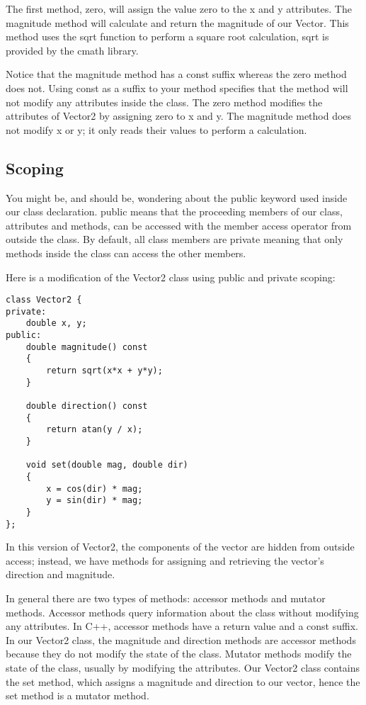 \documentclass[a4paper,12pt]{article}
\begin{document}
The first method, zero, will assign the value zero to the x and y attributes. The magnitude method will calculate and return the magnitude of our Vector. This method uses the sqrt function to perform a square root calculation, sqrt is provided by the cmath library.

Notice that the magnitude method has a const suffix whereas the zero method does not. Using const as a suffix to your method specifies that the method will not modify any attributes inside the class. The zero method modifies the attributes of Vector2 by assigning zero to x and y. The magnitude method does not modify x or y; it only reads their values to perform a calculation.

\subsection*{Scoping}

You might be, and should be, wondering about the public keyword used inside our class declaration. public means that the proceeding members of our class, attributes and methods, can be accessed with the member access operator from outside the class. By default, all class members are private meaning that only methods inside the class can access the other members. 

Here is a modification of the Vector2 class using public and private scoping:

\begin{lstlisting}
class Vector2 {
private:
	double x, y;
public:
	double magnitude() const
	{
		return sqrt(x*x + y*y);
	}

	double direction() const
	{
		return atan(y / x);
	}

	void set(double mag, double dir)
	{
		x = cos(dir) * mag;
		y = sin(dir) * mag;
	}
};
\end{lstlisting}

In this version of Vector2, the components of the vector are hidden from outside access; instead, we have methods for assigning and retrieving the vector's direction and magnitude.

In general there are two types of methods: accessor methods and mutator methods. Accessor methods query information about the class without modifying any attributes. In C++, accessor methods have a return value and a const suffix. In our Vector2 class, the magnitude and direction methods are accessor methods because they do not modify the state of the class. Mutator methods modify the state of the class, usually by modifying the attributes. Our Vector2 class contains the set method, which assigns a magnitude and direction to our vector, hence the set method is a mutator method.
\end{document}
